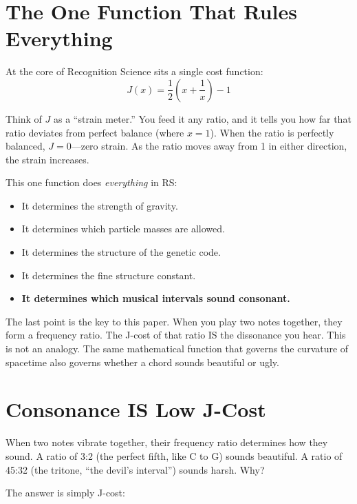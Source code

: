 \documentclass[11pt,a4paper]{article}
\begin{document}
\section{The One Function That Rules Everything}

At the core of Recognition Science sits a single cost function:
\[
J(x) = \frac{1}{2}\!\left(x + \frac{1}{x}\right) - 1
\]

Think of $J$ as a ``strain meter.'' You feed it any ratio, and it tells you how far that ratio deviates from perfect balance (where $x = 1$). When the ratio is perfectly balanced, $J = 0$---zero strain. As the ratio moves away from 1 in either direction, the strain increases.

This one function does \emph{everything} in RS:
\begin{itemize}
    \item It determines the strength of gravity.
    \item It determines which particle masses are allowed.
    \item It determines the structure of the genetic code.
    \item It determines the fine structure constant.
    \item \textbf{It determines which musical intervals sound consonant.}
\end{itemize}

The last point is the key to this paper. When you play two notes together, they form a frequency ratio. The J-cost of that ratio IS the dissonance you hear. This is not an analogy. The same mathematical function that governs the curvature of spacetime also governs whether a chord sounds beautiful or ugly.

\section{Consonance IS Low J-Cost}

When two notes vibrate together, their frequency ratio determines how they sound. A ratio of 3:2 (the perfect fifth, like C to G) sounds beautiful. A ratio of 45:32 (the tritone, ``the devil's interval'') sounds harsh. Why?

The answer is simply J-cost:
\end{document}
